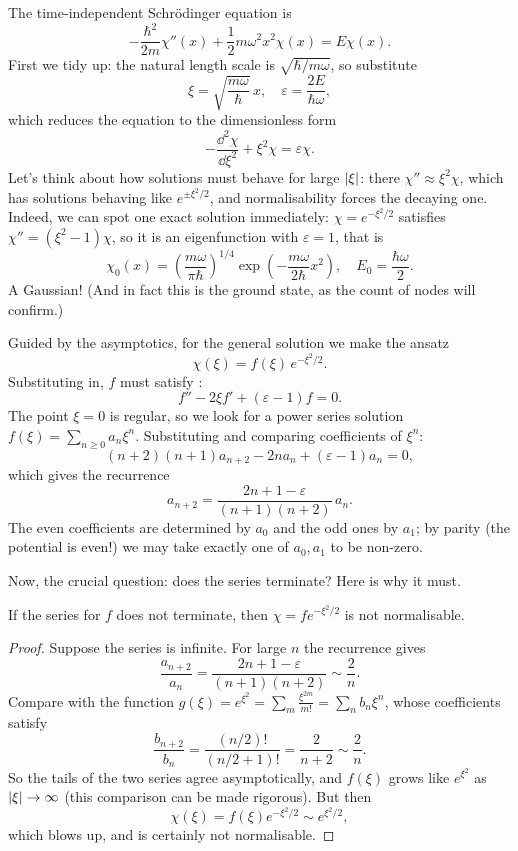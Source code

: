 \documentclass[a4paper]{scrartcl}
\begin{document}
The time-independent Schr\"odinger equation is
$$
-\frac{\hbar^2}{2m} \chi''(x) + \frac{1}{2} m \omega^2 x^2 \chi(x) = E \chi(x).
$$
First we tidy up: the natural length scale is $\sqrt{\hbar / m\omega}$, so substitute
$$
\xi = \sqrt{\frac{m \omega}{\hbar}} \, x, \quad \varepsilon = \frac{2E}{\hbar \omega},
$$
which reduces the equation to the dimensionless form
$$
-\frac{\dd^2 \chi}{\dd \xi^2} + \xi^2 \chi = \varepsilon \chi.
$$
Let's think about how solutions must behave for large $\lvert\xi\rvert$: there $\chi'' \approx \xi^2 \chi$, which has solutions behaving like $e^{\pm \xi^2/2}$, and normalisability forces the decaying one. Indeed, we can spot one exact solution immediately: $\chi = e^{-\xi^2/2}$ satisfies $\chi'' = (\xi^2 - 1)\chi$, so it is an eigenfunction with $\varepsilon = 1$, that is
$$
\chi_0(x) = \left(\frac{m\omega}{\pi\hbar}\right)^{1/4} \exp\left( -\frac{m \omega}{2 \hbar} x^2 \right), \quad E_0 = \frac{\hbar \omega}{2}.
$$
A Gaussian! (And in fact this is the ground state, as the count of nodes will confirm.)

Guided by the asymptotics, for the general solution we make the ansatz
$$
\chi(\xi) = f(\xi) \, e^{-\xi^2/2}.
$$
Substituting in, $f$ must satisfy :
$$
f'' - 2 \xi f' + (\varepsilon - 1) f = 0.
$$
The point $\xi = 0$ is regular, so we look for a power series solution $f(\xi) = \sum_{n \geq 0} a_n \xi^n$. Substituting and comparing coefficients of $\xi^n$:
$$
(n+2)(n+1) a_{n+2} - 2n a_n + (\varepsilon - 1) a_n = 0,
$$
which gives the recurrence
$$
a_{n+2} = \frac{2n + 1 - \varepsilon}{(n+1)(n+2)} \, a_n.
$$
The even coefficients are determined by $a_0$ and the odd ones by $a_1$; by parity (the potential is even!) we may take exactly one of $a_0, a_1$ to be non-zero.

Now, the crucial question: does the series terminate? Here is why it must.

\begin{proposition}
    If the series for $f$ does not terminate, then $\chi = f e^{-\xi^2/2}$ is not normalisable.
\end{proposition}
\begin{proof}
    Suppose the series is infinite. For large $n$ the recurrence gives
    $$
    \frac{a_{n+2}}{a_n} = \frac{2n + 1 - \varepsilon}{(n+1)(n+2)} \sim \frac{2}{n}.
    $$
    Compare with the function $g(\xi) = e^{\xi^2} = \sum_m \frac{\xi^{2m}}{m!} = \sum_n b_n \xi^n$, whose coefficients satisfy
    $$
    \frac{b_{n+2}}{b_n} = \frac{(n/2)!}{(n/2+1)!} = \frac{2}{n + 2} \sim \frac{2}{n}.
    $$
    So the tails of the two series agree asymptotically, and $f(\xi)$ grows like $e^{\xi^2}$ as $\lvert\xi\rvert \rightarrow \infty$ (this comparison can be made rigorous). But then
    $$
    \chi(\xi) = f(\xi) e^{-\xi^2/2} \sim e^{\xi^2/2},
    $$
    which blows up, and is certainly not normalisable.
\end{proof}
\end{document}
